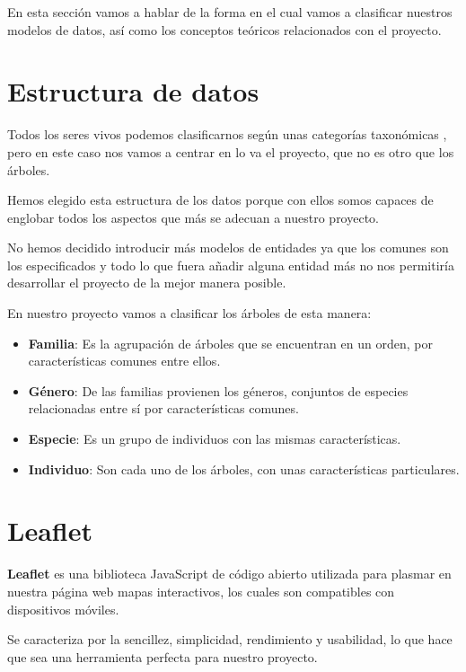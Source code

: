 
En esta sección vamos a hablar de la forma en el cual vamos a clasificar nuestros modelos de datos, así como los conceptos teóricos relacionados con el proyecto.

\section{Estructura de datos}

Todos los seres vivos podemos clasificarnos según unas categorías taxonómicas \cite{CategoriaTaxonomica}, pero en este caso nos vamos a centrar en lo va el proyecto, que no es otro que los árboles.

Hemos elegido esta estructura de los datos porque con ellos somos capaces de englobar todos los aspectos que más se adecuan a nuestro proyecto.

No hemos decidido introducir más modelos de entidades ya que los comunes son los especificados y todo lo que fuera añadir alguna entidad más no nos permitiría desarrollar el proyecto de la mejor manera posible.

En nuestro proyecto vamos a clasificar los árboles de esta manera:
\begin{itemize}
	\item \textbf{Familia}: Es la agrupación de árboles que se encuentran en un orden, por características comunes entre ellos.
	\item \textbf{Género}: De las familias provienen los géneros, conjuntos de especies relacionadas entre sí por características comunes.
	\item \textbf{Especie}: Es un grupo de individuos con las mismas características.
	\item \textbf{Individuo}: Son cada uno de los árboles, con unas características particulares.
\end{itemize}
\section{Leaflet}

\textbf{Leaflet} \cite{leaflet} es una biblioteca JavaScript de código abierto utilizada para plasmar en nuestra página web mapas interactivos, los cuales son compatibles con dispositivos móviles.

Se caracteriza por la sencillez, simplicidad, rendimiento y usabilidad, lo que hace que sea una herramienta perfecta para nuestro proyecto.

